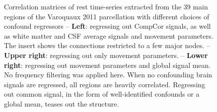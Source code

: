 \documentclass[5p]{elsarticle}
\begin{document}
\begin{figure}

\caption{
Correlation matrices of rest time-series extracted from the 39 main
regions of the Varoquaux 2011 \cite{varoquaux2011} parcellation with
different choices of confound regressors -- 
\textbf{Left}: regressing out CompCor signals, as well as white matter and
CSF average signals and movement parameters. The insert shows the
connections restricted to a few major nodes.
-- \textbf{Upper right}: regressing out only movement parameters. -- 
\textbf{Lower right}:
regressing out movement parameters and global signal mean.
No frequency filtering was applied here.
\label{fig:correlation_matrices}
When no confounding brain signals are regressed, all regions are heavily
correlated. Regressing out common signal, in the form of well-identified
confounds or a global mean, teases out the structure.
}
\end{figure}


\end{document}

